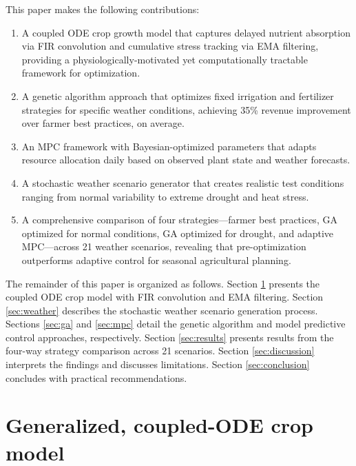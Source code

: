 \documentclass[pdflatex,sn-mathphys-num]{sn-jnl}
\begin{document}
This paper makes the following contributions:
\begin{enumerate}
\item A coupled ODE crop growth model that captures delayed nutrient absorption via FIR convolution and cumulative stress tracking via EMA filtering, providing a physiologically-motivated yet computationally tractable framework for optimization.
\item A genetic algorithm approach that optimizes fixed irrigation and fertilizer strategies for specific weather conditions, achieving 35\% revenue improvement over farmer best practices, on average.
\item An MPC framework with Bayesian-optimized parameters that adapts resource allocation daily based on observed plant state and weather forecasts.
\item A stochastic weather scenario generator that creates realistic test conditions ranging from normal variability to extreme drought and heat stress.
\item A comprehensive comparison of four strategies---farmer best practices, GA optimized for normal conditions, GA optimized for drought, and adaptive MPC---across 21 weather scenarios, revealing that pre-optimization outperforms adaptive control for seasonal agricultural planning.
\end{enumerate}

The remainder of this paper is organized as follows. Section \ref{sec:modeling} presents the coupled ODE crop model with FIR convolution and EMA filtering. Section \ref{sec:weather} describes the stochastic weather scenario generation process. Sections \ref{sec:ga} and \ref{sec:mpc} detail the genetic algorithm and model predictive control approaches, respectively. Section \ref{sec:results} presents results from the four-way strategy comparison across 21 scenarios. Section \ref{sec:discussion} interprets the findings and discusses limitations. Section \ref{sec:conclusion} concludes with practical recommendations.

\section{Generalized, coupled-ODE crop model}\label{sec:modeling}
\end{document}
